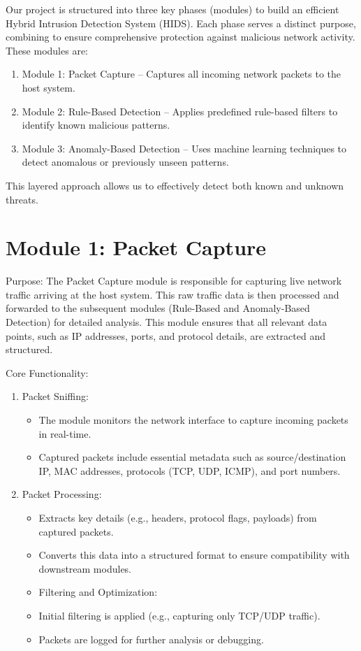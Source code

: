 \documentclass[oneside, english]{reports/assets/sdqtechreport}
\begin{document}
Our project is structured into three key phases (modules) to build an efficient
Hybrid Intrusion Detection System (HIDS). Each phase serves a distinct purpose,
combining to ensure comprehensive protection against malicious network
activity. These modules are:

\begin{enumerate}
	\item Module 1: Packet Capture – Captures all incoming network packets to the host
	      system.
	\item Module 2: Rule-Based Detection – Applies predefined rule-based filters to
	      identify known malicious patterns.
	\item Module 3: Anomaly-Based Detection – Uses machine learning techniques to detect
	      anomalous or previously unseen patterns.
\end{enumerate}

This layered approach allows us to effectively detect both known and unknown
threats.

\section{Module 1: Packet Capture}
\label{sec:PacketCapture}

Purpose: The Packet Capture module is responsible for capturing live network
traffic arriving at the host system. This raw traffic data is then processed
and forwarded to the subsequent modules (Rule-Based and Anomaly-Based
Detection) for detailed analysis. This module ensures that all relevant data
points, such as IP addresses, ports, and protocol details, are extracted and
structured.

Core Functionality:
\begin{enumerate}
	\item Packet Sniffing:
	      \begin{itemize}
		      \item The module monitors the network interface to capture incoming packets in
		            real-time.
		      \item Captured packets include essential metadata such as source/destination IP, MAC
		            addresses, protocols (TCP, UDP, ICMP), and port numbers.
	      \end{itemize}
	\item Packet Processing:
	      \begin{itemize}
		      \item Extracts key details (e.g., headers, protocol flags, payloads) from captured
		            packets.
		      \item Converts this data into a structured format to ensure compatibility with
		            downstream modules.
		      \item Filtering and Optimization:
	      \end{itemize}
	      \begin{itemize}
		      \item Initial filtering is applied (e.g., capturing only TCP/UDP traffic).
		      \item Packets are logged for further analysis or debugging.
	      \end{itemize}
\end{enumerate}
\end{document}
